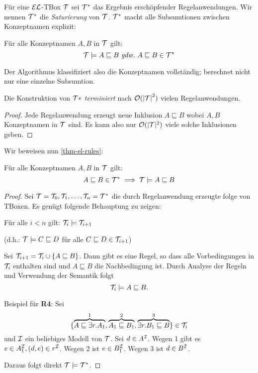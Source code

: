 Für eine $\mathcal{E}\mathcal{L}$-TBox $\mathcal{T}$ sei $\mathcal{T}^*$ das Ergebnis erschöpfender
Regelanwendungen. Wir nennen $\mathcal{T}^*$ die \emph{Saturierung} von $\mathcal{T}$. $\mathcal{T}^*$ macht alle Subsumtionen zwischen Konzeptnamen explizit:
\begin{theorem}\label{thm-el-rules}
    Für alle Konzeptnamen $A, B$ in $\mathcal{T}$ gilt:
    \[
        \mathcal{T} \models A \sqsubseteq B \ \mathit{gdw.}\  A \sqsubseteq B \in \mathcal{T}^*
    \]
\end{theorem}
Der Algorithmus klassifiziert also die Konzeptnamen vollständig; berechnet nicht nur eine einzelne Subsumtion.

\begin{theorem}
    Die Konstruktion von $\mathcal{T}*$ \emph{terminiert} nach $\mathcal{O}({|\mathcal{T}|}^2)$ vielen Regelanwendungen.
\end{theorem}
\begin{tafel}
    \begin{proof}
        Jede Regelanwendung erzeugt neue Inklusion $A \sqsubseteq B$ wobei $A, B$ Konzeptnamen in $\mathcal{T}$ sind. Es kann also nur $\mathcal{O}(|\mathcal{T}|^2)$ viele solche Inklusionen geben.
    \end{proof}
\end{tafel}

Wir beweisen nun \autoref{thm-el-rules}:

\begin{theorem}
    Für alle Konzeptnamen $A, B$ in $\mathcal{T}$ gilt:
    \[
        A \sqsubseteq B \in \mathcal{T}^* \implies \mathcal{T} \models A \sqsubseteq B
    \]
\end{theorem}

\begin{proof}
    Sei $\mathcal{T} = \mathcal{T}_0, \mathcal{T}_1, \ldots, \mathcal{T}_n = \mathcal{T}^*$ die durch Regelanwendung erzeugte folge von TBoxen. Es genügt folgende Behauptung zu zeigen:
    \begin{center}
        Für alle $i < n$ gilt: $\mathcal{T}_i \models \mathcal{T}_{i + 1}$
    \end{center}
    (d.h.: $\mathcal{T} \models C \sqsubseteq D$ für alle $C \sqsubseteq D \in \mathcal{T}_{i + 1}$)
    \begin{tafel}
    Sei $\mathcal{T}_{i + 1} = \mathcal{T}_i \cup \{ A \sqsubseteq B\}$. Dann gibt es eine Regel, so dass alle Vorbedingungen in $\mathcal{T}_i$ enthalten sind und $A \sqsubseteq B$ die Nachbedingung ist. Durch Analyse der Regeln und Verwendung der Semantik folgt \[ \mathcal{T}_i \models A \sqsubseteq B. \]

    Beispiel für \textbf{R4}: Sei 
    \[
        \{ \overbrace{A \sqsubseteq \exists r.A_1}^1, \overbrace{ A_1 \sqsubseteq B_1}^2, \overbrace{\exists r.B_1 \sqsubseteq B}^3 \} \in \mathcal{T}_i
    \]
    und $\mathcal{I}$ ein beliebiges Modell von $\mathcal{T}$. Sei $d \in A^{\mathcal{I}}$. Wegen 1 gibt es $e \in A^{\mathcal{I}}_1, (d, e) \in r^{\mathcal{I}}$. Wegen 2 ist $e \in B_1^{\mathcal{I}}$. Wegen 3 ist $d \in B^{\mathcal{I}}$.
\end{tafel}

    Daraus folgt direkt $\mathcal{T} \models \mathcal{T}^*$.
\end{proof}

